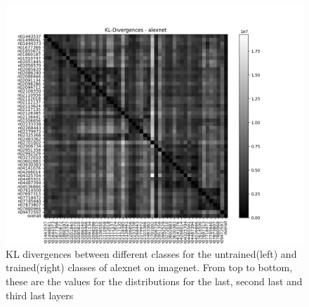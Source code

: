 \documentclass{article}
\begin{document}
\begin{figure}[H]
\begin{minipage}{0.45\textwidth}
        \end{minipage}\hfill
        \begin{minipage}{0.45\textwidth}
            \centering
            \includegraphics[width=\textwidth]{images/alexnet_kl_matrix_imgr_2.png} %
        \end{minipage}
        
        \caption{KL divergences between different classes for the untrained(left) and trained(right) classes of alexnet on imagenet. From top to bottom, these are the values for the distributions for the last, second last and third last layers}
        \label{fig:kl_divergences_imgr}
    \end{figure}
    
\end{document}
